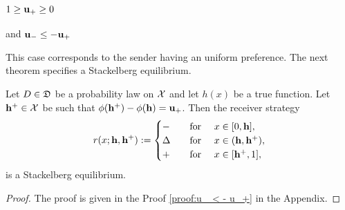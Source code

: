 


\subsubsection{$1 \geq \mathbf{u_+} \geq 0$} and \textbf{$\mathbf{u_-} \leq -\mathbf{u_+}$}

This case corresponds to the sender having an uniform preference. The next theorem specifies a Stackelberg equilibrium.

\begin{thm}\label{thm:u_ < - u_+}
	Let $D \in \mathfrak{D}$ be a probability law on $\mathcal{X}$ and let $h(x)$ be a true function. Let $\mathbf{h^{+}} \in \mathcal{X}$ be such that $\phi(\mathbf{h^{+}}) - \phi(\mathbf{h}) = \mathbf{u_+}$. Then the receiver strategy
	\[ r(x;\mathbf{h},\mathbf{h^{+}}):=
	\begin{cases}
		\mathbf{-} & \hbox{\quad for \quad} x \in [0,\mathbf{h}],\\
		\Delta & \hbox{\quad for \quad} x \in (\mathbf{h},\mathbf{h^{+}}),\\
		\mathbf{+} & \hbox{\quad for \quad} x \in [\mathbf{h^{+}},1],
	\end{cases}\]
	is a Stackelberg equilibrium.
\end{thm}

\begin{proof} The proof is given in the Proof \ref{proof:u_ < - u_+} in the Appendix.
	\end{proof}